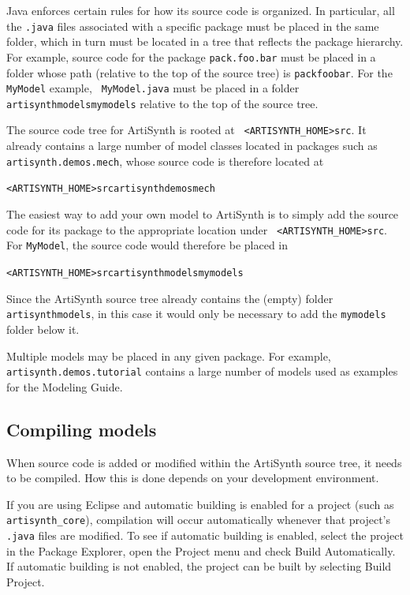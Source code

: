 Java enforces certain rules for how its source code is organized.  In
particular, all the {\tt .java} files associated with a specific
package must be placed in the same folder, which in turn must be located in a
\directory{} tree that reflects the package hierarchy. For
example, source code for the package {\tt pack.foo.bar} must be placed
in a folder whose path (relative to the top of the source tree) is
{\tt pack\SEP foo\SEP bar}.  For the {\tt MyModel} example, {\tt
MyModel.java} must be placed in
a folder {\tt artisynth\SEP models\SEP mymodels} relative to the top
of the source tree.

The source code tree for ArtiSynth is rooted at {\tt
<ARTISYNTH\_HOME>\SEP src}. It already contains a large number of
model classes located in packages such as {\tt
artisynth.demos.mech}, whose source code is therefore located at

{\tt <ARTISYNTH\_HOME>\SEP src\SEP artisynth\SEP demos\SEP mech}

The easiest way to add your own model to ArtiSynth is to simply add
the source code for its package to the appropriate location under {\tt
<ARTISYNTH\_HOME>\SEP src}. For {\tt MyModel}, the source code would
therefore be placed in

{\tt <ARTISYNTH\_HOME>\SEP src\SEP artisynth\SEP models\SEP mymodels}

Since the ArtiSynth source tree already contains the (empty) folder
{\tt artisynth\SEP models}, in this case it would only be necessary to
add the {\tt mymodels} folder below it.

\begin{sideblock}
Multiple models may be placed in any given package. For example, {\tt
artisynth.demos.tutorial} contains a large number of models used as
examples for the Modeling Guide.
\end{sideblock}

\subsection{Compiling models}

When source code is added or modified within the ArtiSynth source
tree, it needs to be compiled. How this is done depends on your
development environment.

If you are using Eclipse and automatic building is enabled for a
project (such as {\tt artisynth\_core}), compilation will occur
automatically whenever that project's {\tt .java} files are
modified. To see if automatic building is enabled, select the project
in the Package Explorer, open the {\sf Project} menu and check {\sf
Build Automatically}. If automatic building is not enabled, the
project can be built by selecting {\sf Build Project}.

